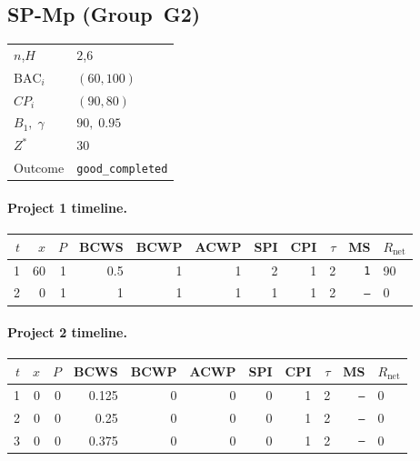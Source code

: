 \documentclass[12pt, a4paper]{article}
\newcommand{\BAC}{\mathrm{BAC}}
\begin{document}
\newpage

\subsection*{SP-Mp  (Group~G2)}
\begin{center}
\begin{tabular}{ll}
\toprule
$n$,\;$H$ & $2$,\;$6$ \\
$\BAC_i$ & $(60, 100)$ \\
$CP_i$   & $(90, 80)$ \\
$B_1,\;\gamma$ & $90,\;0.95$ \\
$Z^*$ & $30$ \\
Outcome & \texttt{good_completed} \\
\bottomrule
\end{tabular}
\end{center}

\paragraph{Project 1 timeline.}
\begin{center}
\begin{tabular}{rrrrrrrrrrl}
\toprule
$t$ & $x$ & $P$ & BCWS & BCWP & ACWP & SPI & CPI & $\tau$ & MS & $R_{\mathrm{net}}$\\
\midrule
1 & 60 & 1 & 0.5 & 1 & 1 & 2 & 1 & 2 & \texttt{1} & 90 \\
2 & 0 & 1 & 1 & 1 & 1 & 1 & 1 & 2 & \texttt{---} & 0 \\
\bottomrule
\end{tabular}
\end{center}
\paragraph{Project 2 timeline.}
\begin{center}
\begin{tabular}{rrrrrrrrrrl}
\toprule
$t$ & $x$ & $P$ & BCWS & BCWP & ACWP & SPI & CPI & $\tau$ & MS & $R_{\mathrm{net}}$\\
\midrule
1 & 0 & 0 & 0.125 & 0 & 0 & 0 & 1 & 2 & \texttt{---} & 0 \\
2 & 0 & 0 & 0.25 & 0 & 0 & 0 & 1 & 2 & \texttt{---} & 0 \\
3 & 0 & 0 & 0.375 & 0 & 0 & 0 & 1 & 2 & \texttt{---} & 0 \\
\bottomrule
\end{tabular}
\end{center}
\end{document}
